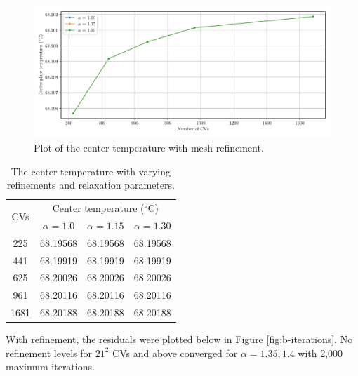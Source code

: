 \documentclass{article}
\begin{document}
\begin{figure}[H]
	\centering
	\includegraphics[width=\linewidth]{../results/b-temps}
	\caption{Plot of the center temperature with mesh refinement.}
	\label{fig:b-temps}
\end{figure}

\def\arraystretch{1.3}
\begin{table}[H]
	\small
	\centering
	\caption{The center temperature with varying refinements and relaxation parameters.}
	\vspace{0.2cm}
	\begin{tabular}{c|c|c|c}
		\multirow{2}{*}{CVs} & \multicolumn{3}{c}{Center temperature ($^\circ$C)} \\
		\cline{2-4}
		& $\alpha = 1.0$ & $\alpha = 1.15$ & $\alpha = 1.30$ \\     
		\hline
		225  & 68.19568 & 68.19568 & 68.19568 \\
		441  & 68.19919 & 68.19919 & 68.19919 \\
		625  & 68.20026 & 68.20026 & 68.20026 \\
		961  & 68.20116 & 68.20116 & 68.20116 \\
		1681 & 68.20188 & 68.20188 & 68.20188
	\end{tabular}
	\label{table:b-temps}
\end{table}

With refinement, the residuals were plotted below in Figure \ref{fig:b-iterations}. No refinement levels for $21^2$ CVs and above converged for $\alpha = 1.35, 1.4$ with 2,000 maximum iterations.
\end{document}
